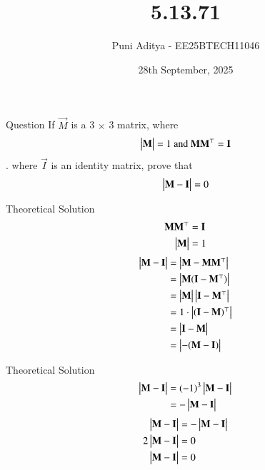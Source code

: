 \documentclass{beamer}
\title{5.13.71}
\date{28th September, 2025}
\author{Puni Aditya - EE25BTECH11046}
\begin{document}
\frame{\titlepage}
\begin{frame}{Question}
If $\vec{M}$ is a 3 $\times$ 3 matrix, where 
\begin{align*}
    \begin{vmatrix}\mathbf{M}\end{vmatrix} = 1\text{ and }\mathbf{M}\mathbf{M}^\top = \mathbf{I}
\end{align*}. where $\vec{I}$ is an identity matrix, prove that 
\begin{align*}
    \begin{vmatrix}\mathbf{M} - \mathbf{I}\end{vmatrix} = 0
\end{align*}
\end{frame}

\begin{frame}{Theoretical Solution}
\begin{align*}
    \mathbf{M}\mathbf{M}^\top &= \mathbf{I} \\
    \begin{vmatrix}\mathbf{M}\end{vmatrix} &= 1
\end{align*}
\begin{align}
    \begin{vmatrix}\mathbf{M}-\mathbf{I}\end{vmatrix} &= \begin{vmatrix}\mathbf{M} - \mathbf{M}\mathbf{M}^\top\end{vmatrix} \\
    &= \begin{vmatrix}\mathbf{M}(\mathbf{I} - \mathbf{M}^\top)\end{vmatrix} \\
    &= \begin{vmatrix}\mathbf{M}\end{vmatrix}\begin{vmatrix}\mathbf{I} - \mathbf{M}^\top\end{vmatrix} \\
    &= 1 \cdot \begin{vmatrix}(\mathbf{I} - \mathbf{M})^\top\end{vmatrix} \\
    &= \begin{vmatrix}\mathbf{I} - \mathbf{M}\end{vmatrix} \\
    &= \begin{vmatrix}-(\mathbf{M} - \mathbf{I})\end{vmatrix}
\end{align}
\end{frame}

\begin{frame}{Theoretical Solution}
\begin{align}
    \begin{vmatrix}\mathbf{M}-\mathbf{I}\end{vmatrix} &= (-1)^3 \begin{vmatrix}\mathbf{M} - \mathbf{I}\end{vmatrix} \\
    &= -\begin{vmatrix}\mathbf{M} - \mathbf{I}\end{vmatrix}
\end{align}
\begin{align}
    \begin{vmatrix}\mathbf{M}-\mathbf{I}\end{vmatrix} &= -\begin{vmatrix}\mathbf{M}-\mathbf{I}\end{vmatrix} \\
    2\begin{vmatrix}\mathbf{M}-\mathbf{I}\end{vmatrix} &= 0 \\
    \begin{vmatrix}\mathbf{M}-\mathbf{I}\end{vmatrix} &= 0
\end{align}
\end{frame}
\end{document}
